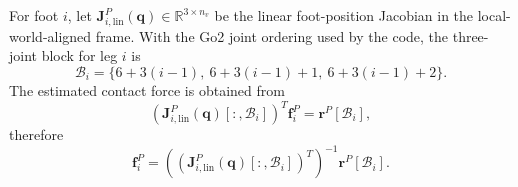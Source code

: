 \documentclass[11pt, a4paper]{article}
\begin{document}
For foot $i$, let
$\bm{J}^{P}_{i,\mathrm{lin}}(\bm{q})\in\mathbb{R}^{3\times n_v}$ be the
linear foot-position Jacobian in the local-world-aligned frame. With the Go2
joint ordering used by the code, the three-joint block for leg $i$ is
\begin{equation}
    \mathcal{B}_i
    =
    \{6+3(i-1),\ 6+3(i-1)+1,\ 6+3(i-1)+2\}.
\end{equation}
The estimated contact force is obtained from
\begin{equation}
    \left(
        \bm{J}^{P}_{i,\mathrm{lin}}(\bm{q})[:,\mathcal{B}_i]
    \right)^{T}
    \bm{f}^{P}_i
    =
    \bm{r}^{P}[\mathcal{B}_i],
\end{equation}
therefore
\begin{equation}
    \bm{f}^{P}_i
    =
    \left(
        \left(
            \bm{J}^{P}_{i,\mathrm{lin}}(\bm{q})[:,\mathcal{B}_i]
        \right)^{T}
    \right)^{-1}
    \bm{r}^{P}[\mathcal{B}_i].
\end{equation}
\end{document}
